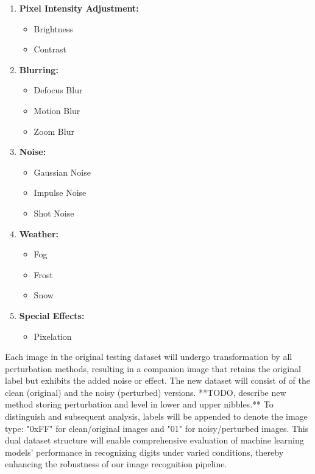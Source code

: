 \begin{enumerate}
    \item \textbf{Pixel Intensity Adjustment:}
    \begin{itemize}
        \item Brightness
        \item Contrast
    \end{itemize}
    \item \textbf{Blurring:}
    \begin{itemize}
        \item Defocus Blur
        \item Motion Blur
        \item Zoom Blur
    \end{itemize}
    \item \textbf{Noise:}
    \begin{itemize}
        \item Gaussian Noise
        \item Impulse Noise
        \item Shot Noise
    \end{itemize}
    \item \textbf{Weather:}
    \begin{itemize}
        \item Fog
        \item Frost
        \item Snow
    \end{itemize}
    \item \textbf{Special Effects:}
    \begin{itemize}
        \item Pixelation
    \end{itemize}
\end{enumerate}

Each image in the original testing dataset will undergo transformation by all perturbation methods, resulting in a companion image that retains the original label but exhibits the added noise or effect. The new dataset will consist of of the clean (original) and the noisy (perturbed) versions. 
**TODO, describe new method storing perturbation and level in lower and upper nibbles.**
To distinguish and subsequent analysis, labels will be appended to denote the image type: "0xFF" for clean/original images and "01" for noisy/perturbed images. This dual dataset structure will enable comprehensive evaluation of machine learning models' performance in recognizing digits under varied conditions, thereby enhancing the robustness of our image recognition pipeline.


